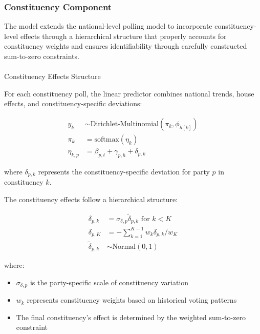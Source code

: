 \documentclass[
  letterpaper,
  DIV=11,
  numbers=noendperiod]{scrartcl}
\makeatletter
\let\oldparagraph\paragraph
\renewcommand{\paragraph}{
    \@ifstar
      \xxxParagraphStar
      \xxxParagraphNoStar
  }
\newcommand{\xxxParagraphStar}[1]{\oldparagraph*{#1}\mbox{}}
\newcommand{\xxxParagraphNoStar}[1]{\oldparagraph{#1}\mbox{}}
\providecommand{\tightlist}{%
  \setlength{\itemsep}{0pt}\setlength{\parskip}{0pt}}\usepackage{longtable,booktabs,array}
\makeatother
\begin{document}
\subsubsection{Constituency Component}\label{constituency-component}

The model extends the national-level polling model to incorporate
constituency-level effects through a hierarchical structure that
properly accounts for constituency weights and ensures identifiability
through carefully constructed sum-to-zero constraints.

\paragraph{Constituency Effects
Structure}\label{constituency-effects-structure}

For each constituency poll, the linear predictor combines national
trends, house effects, and constituency-specific deviations:

\[
\begin{aligned}
y_{k} &\sim \text{Dirichlet-Multinomial}(\pi_k, \phi_{h[k]}) \\
\pi_k &= \text{softmax}(\eta_k) \\
\eta_{k,p} &= \beta_{p,t} + \gamma_{p,h} + \delta_{p,k}
\end{aligned}
\]

where \(\delta_{p,k}\) represents the constituency-specific deviation
for party \(p\) in constituency \(k\).

The constituency effects follow a hierarchical structure:

\[
\begin{aligned}
\delta_{p,k} &= \sigma_{\delta,p} \tilde{\delta}_{p,k} \text{ for } k < K \\
\delta_{p,K} &= -\sum_{k=1}^{K-1} w_k\delta_{p,k} / w_K \\
\tilde{\delta}_{p,k} &\sim \text{Normal}(0, 1)
\end{aligned}
\]

where:

\begin{itemize}
\tightlist
\item
  \(\sigma_{\delta,p}\) is the party-specific scale of constituency
  variation
\item
  \(w_k\) represents constituency weights based on historical voting
  patterns
\item
  The final constituency's effect is determined by the weighted
  sum-to-zero constraint
\end{itemize}
\end{document}
